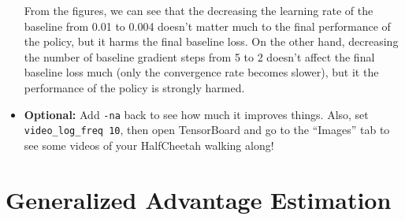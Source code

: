 \documentclass{article}
\begin{document}
\begin{itemize}
From the figures, we can see that the decreasing the learning rate of the baseline from 0.01 to 0.004 doesn't matter much to the final performance of the policy, but it harms the final baseline loss. On the other hand, decreasing the number of baseline gradient steps from 5 to 2 doesn't affect the final baseline loss much (only the convergence rate becomes slower), but it the performance of the policy is strongly harmed.

        \item \textbf{Optional:} Add \verb|-na| back to see how much it improves things. Also, set \verb|video_log_freq 10|, then open TensorBoard and go to the ``Images'' tab to see some videos of your HalfCheetah walking along!
\end{itemize}

\newpage\section{Generalized Advantage Estimation}
\end{document}

